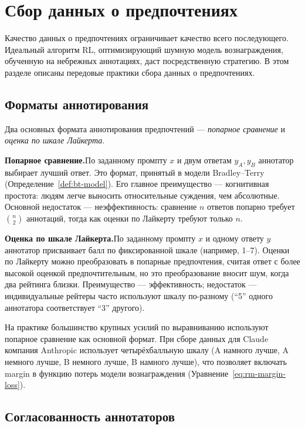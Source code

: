\section{Сбор данных о предпочтениях}
\label{sec:collecting-preferences}

Качество данных о предпочтениях ограничивает качество всего последующего. Идеальный алгоритм RL, оптимизирующий шумную модель вознаграждения, обученную на небрежных аннотациях, даст посредственную стратегию. В этом разделе описаны передовые практики сбора данных о предпочтениях.

\subsection{Форматы аннотирования}

Два основных формата аннотирования предпочтений --- \emph{попарное сравнение} и \emph{оценка по шкале Лайкерта}.

\textbf{Попарное сравнение.}\quad По заданному промпту $x$ и двум ответам $y_A, y_B$ аннотатор выбирает лучший ответ. Это формат, принятый в модели Bradley--Terry (Определение~\ref{def:bt-model}). Его главное преимущество --- когнитивная простота: людям легче выносить относительные суждения, чем абсолютные. Основной недостаток --- неэффективность: сравнение $n$ ответов попарно требует $\binom{n}{2}$ аннотаций, тогда как оценки по Лайкерту требуют только $n$.

\textbf{Оценка по шкале Лайкерта.}\quad По заданному промпту $x$ и одному ответу $y$ аннотатор присваивает балл по фиксированной шкале (например, 1--7). Оценки по Лайкерту можно преобразовать в попарные предпочтения, считая ответ с более высокой оценкой предпочтительным, но это преобразование вносит шум, когда два рейтинга близки. Преимущество --- эффективность; недостаток --- индивидуальные рейтеры часто используют шкалу по-разному (``5'' одного аннотатора соответствует ``3'' другого).

На практике большинство крупных усилий по выравниванию используют попарное сравнение как основной формат. При сборе данных для Claude компания Anthropic использует четырёхбалльную шкалу (A намного лучше, A немного лучше, B немного лучше, B намного лучше), что позволяет включать margin в функцию потерь модели вознаграждения (Уравнение~\eqref{eq:rm-margin-loss}).

\subsection{Согласованность аннотаторов}

